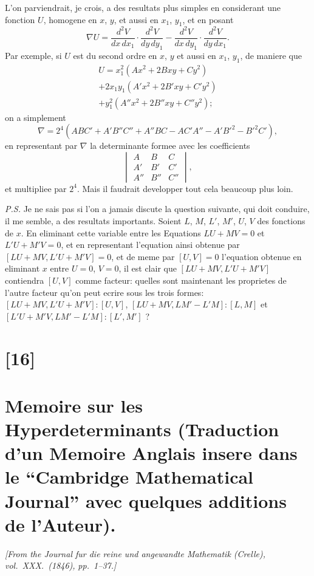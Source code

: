 \documentclass[12pt,a4paper]{article}
\begin{document}
L'on parviendrait, je crois, a des resultats plus simples en considerant une fonction
$U$, homogene en $x$, $y$, et aussi en $x_1$, $y_1$, et en posant
\[
\nabla U = \frac{d^2V}{dx\,dx_1} \cdot \frac{d^2V}{dy\,dy_1}
- \frac{d^2V}{dx\,dy_1} \cdot \frac{d^2V}{dy\,dx_1}.
\]
Par exemple, si $U$ est du second ordre en $x$, $y$ et aussi en $x_1$, $y_1$, de maniere que
\begin{multline*}
U = x_1^2 (Ax^2 + 2Bxy + Cy^2) \\
+ 2x_1y_1 (A'x^2 + 2B'xy + C'y^2) \\
+ y_1^2 (A''x^2 + 2B''xy + C''y^2);
\end{multline*}
on a simplement
\[
\nabla = 2^4 (ABC' + A'B''C'' + A''BC - AC'A'' - A'B'^2 - B'^2C'),
\]
en representant par $\nabla$ la determinante formee avec les coefficients
\[
\begin{vmatrix}
A & B & C\\
A' & B' & C'\\
A'' & B'' & C''
\end{vmatrix},
\]
et multipliee par $2^4$. Mais il faudrait developper tout cela beaucoup plus loin.

\medskip
\textit{P.S.} Je ne sais pas si l'on a jamais discute la question suivante, qui doit conduire,
il me semble, a des resultats importants. Soient $L$, $M$, $L'$, $M'$, $U$, $V$ des fonctions
de $x$. En eliminant cette variable entre les Equations $LU + MV = 0$ et $L'U + M'V = 0$,
et en representant l'equation ainsi obtenue par $[LU + MV, L'U + M'V] = 0$, et
de meme par $[U, V] = 0$ l'equation obtenue en eliminant $x$ entre $U = 0$, $V = 0$,
il est clair que $[LU + MV, L'U + M'V]$ contiendra $[U, V]$ comme facteur: quelles
sont maintenant les proprietes de l'autre facteur qu'on peut ecrire sous les trois
formes: $[LU + MV, L'U + M'V] : [U, V]$, $[LU + MV, LM' - L'M] : [L, M]$ et
$[L'U + M'V, LM'-L'M] : [L', M']$ ?

\newpage
\section*{[16]}
\section*{Memoire sur les Hyperdeterminants (Traduction d'un Memoire Anglais insere dans le ``Cambridge Mathematical Journal'' avec quelques additions de l'Auteur).}

\textit{[From the Journal fur die reine und angewandte Mathematik (Crelle), vol.~XXX.~(1846),}
\textit{pp.~1--37.]}
\end{document}
